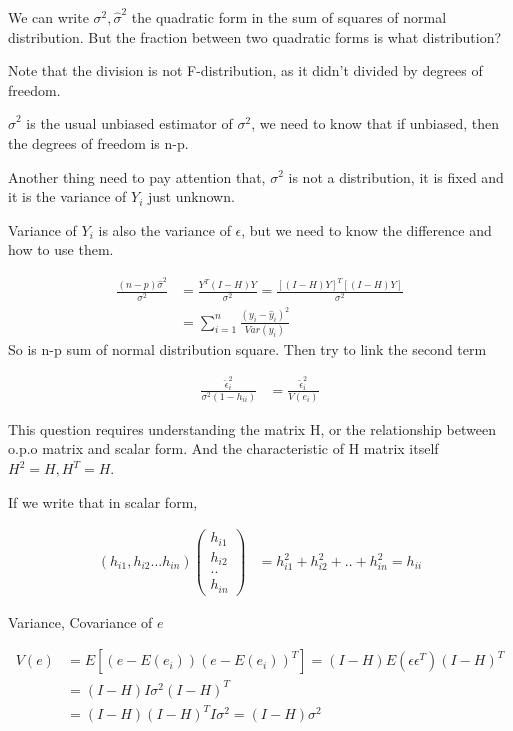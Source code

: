 \documentclass[11pt]{article} %
\begin{document}
We can write $\sigma^2, \hat{\sigma}^2$ the quadratic form in the sum of squares of normal distribution. But the fraction between two quadratic forms is what distribution? 

Note that the division is not F-distribution, as it didn't divided by degrees of freedom. 

$\hat{\sigma}^2$ is the usual unbiased estimator of $\sigma^2$, we need to know that if unbiased, then the degrees of freedom is n-p.

Another thing need to pay attention that,  $\sigma^2$ is not a distribution, it is fixed and it is the variance of $Y_i$ just unknown. 

Variance of $Y_i$ is also the variance of $\epsilon$, but we need to know the difference and how to use them.

\begin{align*}
	\frac{(n-p)\hat{\sigma}^2 }{\sigma^2} &= \frac{Y^T (I-H) Y}{\sigma^2} = \frac{[(I-H)Y]^T [(I-H)Y]}{\sigma^2} \\
	&= \sum_{i=1}^n  \frac{(y_i-\hat{y}_i)^2}{Var(y_i)}
\end{align*}
So  is n-p sum of normal distribution square. Then try to link the second term

\begin{align*}
	\frac{\hat{\epsilon}_i^2}{\sigma^2(1-h_{ii})}&= \frac{\hat{\epsilon}_i^2}{V(e_i)} 
\end{align*}

This question requires understanding the matrix H, or the relationship between o.p.o matrix and scalar form. And the characteristic of H matrix itself $H^2 = H, H^T = H$. 

If we write that in scalar form, 

\begin{align*}
	(h_{i1} , h_{i2} ... h_{in}) \begin{pmatrix*} 
		h_{i1} \\
		h_{i2}\\
		..\\
		h_{in}
		\end{pmatrix*}
		  &= h_{i1}^2 + h_{i2}^2 + .. + h_{in}^2 = h_{ii}
\end{align*} 

Variance, Covariance of $e$

\begin{align*}
	V(e) &= E[(e - E(e_i)) (e - E(e_i))^T] = (I-H) E(\epsilon \epsilon^T) (I-H)^T \\
	&= (I-H) I \sigma^2 (I-H)^T \\
	&= (I-H)  (I-H)^T  I \sigma^2 = (I-H) \sigma^2
\end{align*} 
\end{document}
